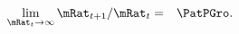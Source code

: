 \begin{eqnarray}
  \lim_{\mRat_{t} \rightarrow \infty} \mRat_{t+1}/\mRat_{t} & = & \PatPGro \label{eq:mGrowthPF}.
\end{eqnarray}
